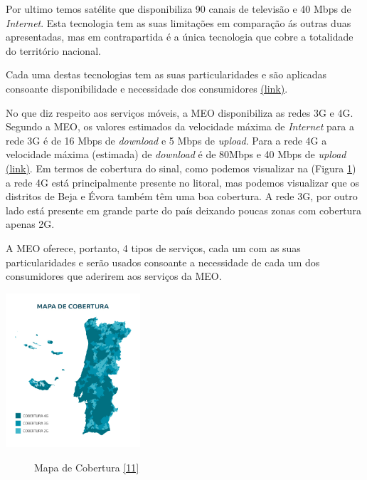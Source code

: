 \documentclass{report}
\begin{document}
	Por ultimo temos satélite que disponibiliza 90 canais de televisão e 40 Mbps de \textit{Internet}. Esta tecnologia tem as suas limitações em comparação ás outras duas apresentadas, mas em contrapartida é a única tecnologia que cobre a totalidade do território nacional.

	Cada uma destas tecnologias tem as suas particularidades e são aplicadas consoante disponibilidade e necessidade dos consumidores \href{https://www.meo.pt/pacotes}{(link)}.

	No que diz respeito aos serviços móveis, a MEO disponibiliza as redes 3G e 4G. Segundo a MEO, os valores estimados da velocidade máxima de \textit{Internet} para a rede 3G é de 16 Mbps de \textit{download} e 5 Mbps de \textit{upload}. Para a rede 4G a velocidade máxima (estimada) de \textit{download} é de 80Mbps e 40 Mbps de \textit{upload} \href{https://conteudos.meo.pt/meo/Documentos/Condicoes-Oferta-Servicos/Mod-C1001276.pdf}{(link)}. Em termos de cobertura do sinal, como podemos visualizar na (Figura \ref{Figura 11}) a rede 4G está principalmente presente no litoral, mas podemos visualizar que os distritos de Beja e Évora também têm uma boa cobertura. A rede 3G, por outro lado está presente em grande parte do país deixando poucas zonas com cobertura apenas 2G.

	A MEO oferece, portanto, 4 tipos de serviços, cada um com as suas particularidades e serão usados consoante a necessidade de cada um dos consumidores que aderirem aos serviços da MEO.
	
	
\begin{center}
\includegraphics[width=5cm]{fig8.jpeg} 
\begin{figure}[h]
\caption{Mapa de Cobertura \href{https://kptuy52666.i.lithium.com/t5/image/serverpage/image-id/169i59E9D89E18800D60/image-size/original?v=mpbl-1&px=-1}{[11]}}
\label{Figura 11}
\end{figure}
\end{center}
\end{document}
